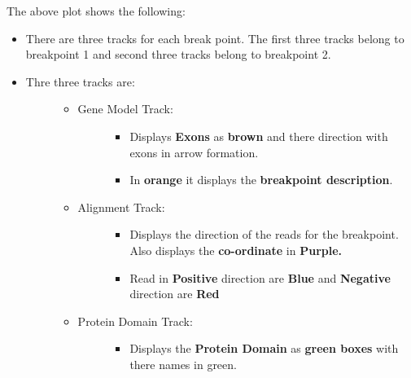 \documentclass[letterpaper,10pt,english]{sphinxmanual}
\begin{document}
The above plot shows the following:
\begin{itemize}
\item {} 
There are three tracks for each break point. The first three tracks belong to breakpoint 1 and second three tracks belong to breakpoint 2.

\item {} \begin{description}
\item[{Thre three tracks are:}] \leavevmode\begin{itemize}
\item {} \begin{description}
\item[{Gene Model Track:}] \leavevmode\begin{itemize}
\item {} 
Displays \textbf{Exons} as \textbf{brown} and there direction with exons in arrow formation.

\item {} 
In \textbf{orange} it displays the \textbf{breakpoint description}.

\end{itemize}

\end{description}

\item {} \begin{description}
\item[{Alignment Track:}] \leavevmode\begin{itemize}
\item {} 
Displays the direction of the reads for the breakpoint. Also displays the \textbf{co-ordinate} in \textbf{Purple.}

\item {} 
Read in \textbf{Positive} direction are \textbf{Blue} and \textbf{Negative} direction are \textbf{Red}

\end{itemize}

\end{description}

\item {} \begin{description}
\item[{Protein Domain Track:}] \leavevmode\begin{itemize}
\item {} 
Displays the \textbf{Protein Domain} as \textbf{green boxes} with there names in green.

\end{itemize}

\end{description}

\end{itemize}

\end{description}

\end{itemize}
\end{document}

